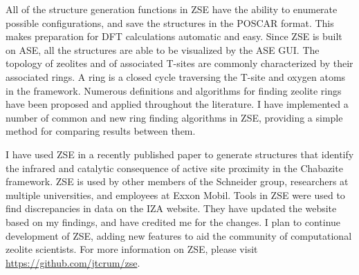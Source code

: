 \documentclass[11pt]{article}
\begin{document}
All of the structure generation functions in ZSE have the ability to enumerate possible configurations, and save the structures in the POSCAR format. This makes preparation for DFT calculations automatic and easy. Since ZSE is built on ASE, all the structures are able to be visualized by the ASE GUI. The topology of zeolites and of associated T-sites are commonly characterized by their associated rings. A ring is a closed cycle traversing the T-site and oxygen atoms in the framework. Numerous definitions and algorithms for finding zeolite rings have been proposed and applied throughout the literature. I have implemented a number of common and new ring finding algorithms in ZSE, providing a simple method for comparing results between them. 

I have used ZSE in a recently published paper to generate structures that identify the infrared and catalytic consequence of active site proximity in the Chabazite framework. ZSE is used by other members of the Schneider group, researchers at multiple universities, and employees at Exxon Mobil. Tools in ZSE were used to find discrepancies in data on the IZA website. They have updated the website based on my findings, and have credited me for the changes. I plan to continue development of ZSE, adding new features to aid the community of computational zeolite scientists. For more information on ZSE, please visit \url{https://github.com/jtcrum/zse}.
\end{document}
